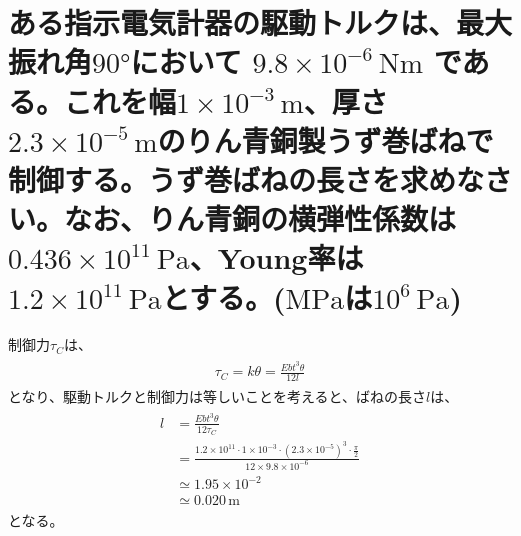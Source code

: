 \documentclass[a4paper,11pt]{jsarticle}
\begin{document}
\title{}
\author{}
\date{\today}


\section{ある指示電気計器の駆動トルクは、最大振れ角$90\si{\degree}$において $9.8\times 10^{-6}\mathrm{\,\si{\newton \metre}}$ である。これを幅$1\times 10^{-3} \mathrm{\,\si{\metre}}$、厚さ$2.3\times 10^{-5}\mathrm{\,\si{\metre}}$のりん青銅製うず巻ばねで制御する。うず巻ばねの長さを求めなさい。なお、りん青銅の横弾性係数は$0.436\times 10^{11}\mathrm{\,\si{\pascal}}$、Young率は$1.2\times 10^{11} \mathrm{\,\si{\pascal}}$とする。($\mathrm{\si{\mega \pascal}}$は$10^{6}\mathrm{\,\si{\pascal}}$)}

制御力$\tau _{C}$は、
\begin{align}
  \begin{split}
    \tau _{C}=k\theta =\frac{Ebt^{3}\theta }{12l}
    \label{eq1}
  \end{split}
\end{align}
となり、駆動トルクと制御力は等しいことを考えると、ばねの長さ$l$は、
\begin{align}
  \begin{split}
    l
    &=\frac{Ebt^{3}\theta }{12\tau _{C}}\\
    &=\frac{1.2\times 10^{11}\cdot 1\times 10^{-3}\cdot (2.3\times 10^{-5})^{3}\cdot \frac{\pi}{2} }{12\times 9.8\times 10^{-6}}\\
    &\simeq 1.95 \times 10^{-2}\\
    &\simeq 0.020\mathrm{\,\si{\metre}}
    \label{eq2}
  \end{split}
\end{align}
となる。
\end{document}
